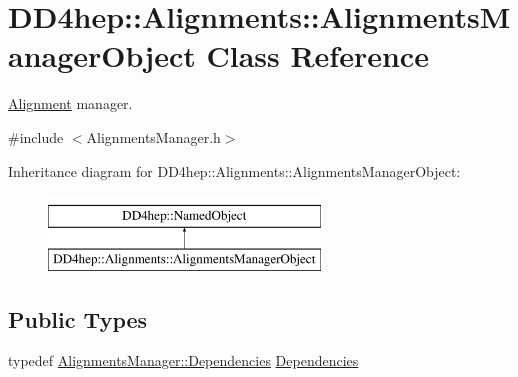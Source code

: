 \hypertarget{class_d_d4hep_1_1_alignments_1_1_alignments_manager_object}{}\section{D\+D4hep\+:\+:Alignments\+:\+:Alignments\+Manager\+Object Class Reference}
\label{class_d_d4hep_1_1_alignments_1_1_alignments_manager_object}


\hyperlink{class_d_d4hep_1_1_alignments_1_1_alignment}{Alignment} manager.  




{\ttfamily \#include $<$Alignments\+Manager.\+h$>$}

Inheritance diagram for D\+D4hep\+:\+:Alignments\+:\+:Alignments\+Manager\+Object\+:\begin{figure}[H]
\begin{center}
\leavevmode
\includegraphics[height=2.000000cm]{class_d_d4hep_1_1_alignments_1_1_alignments_manager_object}
\end{center}
\end{figure}
\subsection*{Public Types}
\begin{DoxyCompactItemize}
\item 
typedef \hyperlink{class_d_d4hep_1_1_alignments_1_1_alignments_manager_ae8068cb8b252db1243c87eccad69e980}{Alignments\+Manager\+::\+Dependencies} \hyperlink{class_d_d4hep_1_1_alignments_1_1_alignments_manager_object_a833ee244e731bbe8cf28bb209181dabc}{Dependencies}
\end{DoxyCompactItemize}
